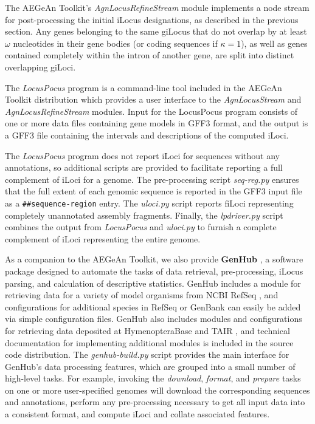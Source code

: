 The AEGeAn Toolkit's \textit{AgnLocusRefineStream} module implements a node stream for post-processing the initial iLocus designations, as described in the previous section.
Any genes belonging to the same giLocus that do not overlap by at least $\omega$ nucleotides in their gene bodies (or coding sequences if $\kappa = 1$), as well as genes contained completely within the intron of another gene, are split into distinct overlapping giLoci.

The \textit{LocusPocus} program is a command-line tool included in the AEGeAn Toolkit distribution which provides a user interface to the \textit{AgnLocusStream} and \textit{AgnLocusRefineStream} modules.
Input for the LocusPocus program consists of one or more data files containing gene models in GFF3 format, and the output is a GFF3 file containing the intervals and descriptions of the computed iLoci.

The \textit{LocusPocus} program does not report iLoci for sequences without any annotations, so additional scripts are provided to facilitate reporting a full complement of iLoci for a genome.
The pre-processing script \textit{seq-reg.py} ensures that the full extent of each genomic sequence is reported in the GFF3 input file as a \texttt{\#\#sequence-region} entry.
The \textit{uloci.py} script reports fiLoci representing completely unannotated assembly fragments.
Finally, the \textit{lpdriver.py} script combines the output from \textit{LocusPocus} and \textit{uloci.py} to furnish a complete complement of iLoci representing the entire genome.

As a companion to the AEGeAn Toolkit, we also provide \textbf{GenHub} \cite{GenHub}, a software package designed to automate the tasks of data retrieval, pre-processing, iLocus parsing, and calculation of descriptive statistics.
GenHub includes a module for retrieving data for a variety of model organisms from NCBI RefSeq \cite{RefSeq}, and configurations for additional species in RefSeq or GenBank can easily be added via simple configuration files.
GenHub also includes modules and configurations for retrieving data deposited at HymenopteraBase \cite{HymBase} and TAIR \cite{TAIR}, and technical documentation for implementing additional modules is included in the source code distribution.
The \textit{genhub-build.py} script provides the main interface for GenHub's data processing features, which are grouped into a small number of high-level tasks.
For example, invoking the \textit{download}, \textit{format}, and \textit{prepare} tasks on one or more user-specified genomes will download the corresponding sequences and annotations, perform any pre-processing necessary to get all input data into a consistent format, and compute iLoci and collate associated features.

